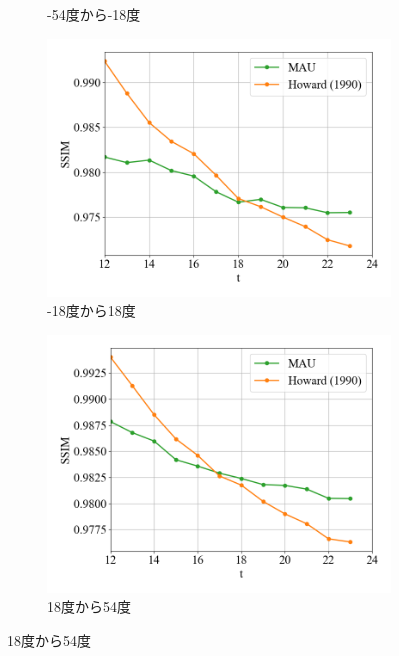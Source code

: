 \begin{figure}[htbp]
\begin{subfigure}{0.5\textwidth}
              \caption{-54度から-18度}
            \end{subfigure} \par
            \begin{subfigure}{0.5\textwidth}
              \centering
              \includegraphics[width=\textwidth]{figures/exp1/lng_ssim_3.png}
              \caption{-18度から18度}
            \end{subfigure}
            \begin{subfigure}{0.5\textwidth}
              \centering
              \includegraphics[width=\textwidth]{figures/exp1/lng_ssim_4.png}
              \caption{18度から54度}
            \end{subfigure} \par

\end{figure}
